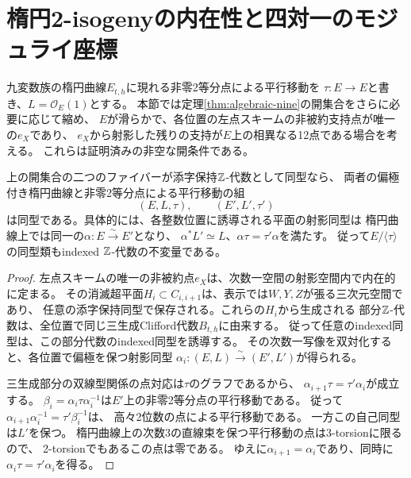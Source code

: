 \section{楕円2-isogenyの内在性と四対一のモジュライ座標}\label{sec:isogeny}
九変数族の楕円曲線$E_{t,h}$に現れる非零2等分点による平行移動を
$\tau:E\to E$と書き、$L=\mathcal O_E(1)$とする。
本節では定理\ref{thm:algebraic-nine}の開集合をさらに必要に応じて縮め、
$E$が滑らかで、各位置の左点スキームの非被約支持点が唯一の$e_X$であり、
$e_X$から射影した残りの支持が$E$上の相異なる12点である場合を考える。
これらは証明済みの非空な開条件である。

\begin{lemma}\label{lem:intrinsic-elliptic-tau}
上の開集合の二つのファイバーが添字保持$\mathbb Z$-代数として同型なら、
両者の偏極付き楕円曲線と非零2等分点による平行移動の組
\[
 (E,L,\tau),\qquad (E',L',\tau')
\]
は同型である。具体的には、各整数位置に誘導される平面の射影同型は
楕円曲線上では同一の$\alpha:E\xrightarrow\sim E'$となり、
$\alpha^*L'\simeq L$、$\alpha\tau=\tau'\alpha$を満たす。
従って$E/\langle\tau\rangle$の同型類もindexed $\mathbb Z$-代数の不変量である。
\end{lemma}
\begin{proof}
左点スキームの唯一の非被約点$e_X$は、次数一空間の射影空間内で内在的に定まる。
その消滅超平面$H_i\subset C_{i,i+1}$は、表示では$W,Y,Z$が張る三次元空間であり、
任意の添字保持同型で保存される。これらの$H_i$から生成される
部分$\mathbb Z$-代数は、全位置で同じ三生成Clifford代数$B_{t,h}$に由来する。
従って任意のindexed同型は、この部分代数のindexed同型を誘導する。
その次数一写像を双対化すると、各位置で偏極を保つ射影同型
$\alpha_i:(E,L)\xrightarrow\sim(E',L')$が得られる。

三生成部分の双線型関係の点対応は$\tau$のグラフであるから、
$\alpha_{i+1}\tau=\tau'\alpha_i$が成立する。
$\beta_i=\alpha_i\tau\alpha_i^{-1}$は$E'$上の非零2等分点の平行移動である。
従って$\alpha_{i+1}\alpha_i^{-1}=\tau'\beta_i^{-1}$は、
高々2位数の点による平行移動である。
一方この自己同型は$L'$を保つ。
楕円曲線上の次数3の直線束を保つ平行移動の点は3-torsionに限るので、
2-torsionでもあるこの点は零である。
ゆえに$\alpha_{i+1}=\alpha_i$であり、同時に
$\alpha_i\tau=\tau'\alpha_i$を得る。
\end{proof}

